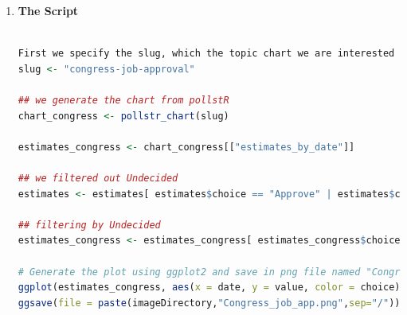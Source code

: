 \documentclass{article}[14pt]
\begin{document}
\begin{section}
\begin{enumerate}[]
\item {\large {\bf The Script}}
\begin{lstlisting}[language = R]

First we specify the slug, which the topic chart we are interested in to
slug <- "congress-job-approval"

## we generate the chart from pollstR
chart_congress <- pollstr_chart(slug)

estimates_congress <- chart_congress[["estimates_by_date"]]

## we filtered out Undecided
estimates <- estimates[ estimates$choice == "Approve" | estimates$choice == "Disapprove",]

## filtering by Undecided
estimates_congress <- estimates_congress[ estimates_congress$choice == "Approve" | estimates_congress$choice == "Disapprove",]

# Generate the plot using ggplot2 and save in png file named "Congress_job_app"
ggplot(estimates_congress, aes(x = date, y = value, color = choice)) + geom_line()
ggsave(file = paste(imageDirectory,"Congress_job_app.png",sep="/"))

\end{lstlisting}
\end{enumerate}

\end{section}



\end{document}
